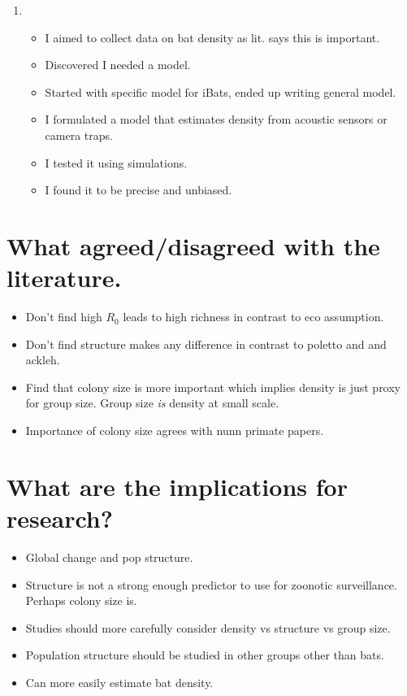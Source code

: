 \begin{enumerate}
\item
\begin{itemize}
\item I aimed to collect data on bat density as lit. says this is important.
\item Discovered I needed a model.
\item Started with specific model for iBats, ended up writing general model.
\item I formulated a model that estimates density from acoustic sensors or camera traps.
\item I tested it using simulations.
\item I found it to be precise and unbiased.
\end{itemize}

\end{enumerate}






\section{What agreed/disagreed with the literature.}

\begin{itemize}
\item Don't find high $R_0$ leads to high richness in contrast to eco assumption.
\item Don't find structure makes any difference in contrast to poletto and \cite{nunes2006localized} and ackleh.
\item Find that colony size is more important which implies density is just proxy for group size. Group size \emph{is} density at small scale.
\item Importance of colony size agrees with nunn primate papers.
\end{itemize}



\section{What are the implications for research?}


\begin{itemize}
\item Global change and pop structure.
\item Structure is not a strong enough predictor to use for zoonotic surveillance. Perhaps colony size is.
\item Studies should more carefully consider density vs structure vs group size.
\item Population structure should be studied in other groups other than bats.
\item Can more easily estimate bat density.
\end{itemize}






